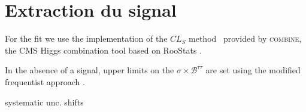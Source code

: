\section{Extraction du signal}\label{chapter-HTT_analysis-section-signal_extraction}

For the fit we use the implementation of the $CL_S$ method~\cite{CLs_method} provided by \textsc{combine}, the CMS Higgs combination tool based on RooStats \cite{RooStats}.

In the absence of a signal, upper limits on the $\sigma\times\mathcal{B}^{\tau\tau}$ are set using the modified frequentist approach \citep{Junk:1999kv,Read_2002}.

systematic unc. shifts~\cite{BarlowBeeston,BarlowBeeston2}



